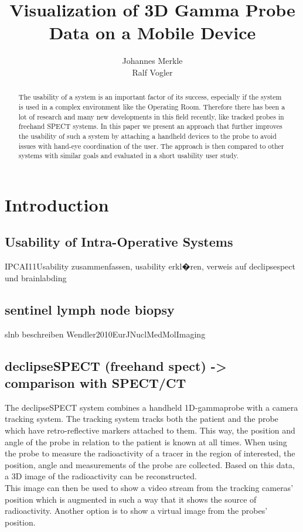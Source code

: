 \documentclass{scrartcl}
\title{Visualization of 3D Gamma Probe Data on a Mobile Device}
\author{Johannes Merkle \\ Ralf Vogler}
\begin{document}
\maketitle

\begin{abstract}
The usability of a system is an important factor of its success, especially if the system is used in a complex environment like the Operating Room. Therefore there has been a lot of research and many new developments in this field recently, like tracked probes in freehand SPECT systems. In this paper we present an approach that further improves the usability of such a system by attaching a handheld devices to the probe to avoid issues with hand-eye coordination of the user. The approach is then compared to other systems with similar goals and evaluated in a short usability user study.
\end{abstract}

\section{Introduction}

\subsection{Usability of Intra-Operative Systems}

IPCAI11Usability zusammenfassen, usability erkl�ren, verweis auf declipsespect und brainlabding

\subsection{sentinel lymph node biopsy}
slnb beschreiben Wendler2010EurJNuclMedMolImaging


\subsection{declipseSPECT (freehand spect) -> comparison with SPECT/CT}


The declipseSPECT system combines a handheld 1D-gammaprobe with a camera tracking system. The tracking system tracks both the patient and the probe which have retro-reflective markers attached to them. This way, the position and angle of the probe in relation to the patient is known at all times. When using the probe to measure the radioactivity of a tracer in the region of interested, the position, angle and measurements of the probe are collected. Based on this data, a 3D image of the radioactivity can be reconstructed.\\
This image can then be used to show a video stream from the tracking cameras' position which is augmented in such a way that it shows the source of radioactivity. Another option is to show a virtual image from the probes' position.
\end{document}
